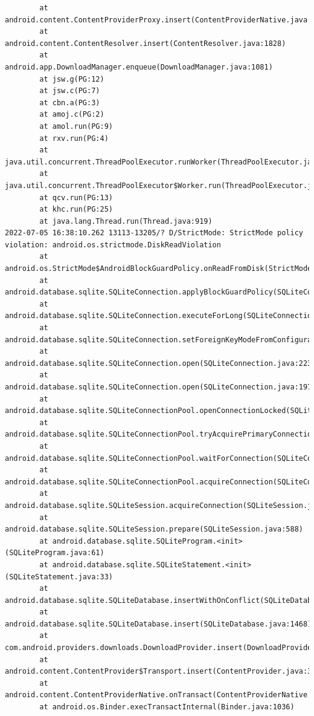 \documentclass[a4paper,12pt]{book}
\begin{document}
\begin{lstlisting}
        at android.content.ContentProviderProxy.insert(ContentProviderNative.java:481)
        at android.content.ContentResolver.insert(ContentResolver.java:1828)
        at android.app.DownloadManager.enqueue(DownloadManager.java:1081)
        at jsw.g(PG:12)
        at jsw.c(PG:7)
        at cbn.a(PG:3)
        at amoj.c(PG:2)
        at amol.run(PG:9)
        at rxv.run(PG:4)
        at java.util.concurrent.ThreadPoolExecutor.runWorker(ThreadPoolExecutor.java:1167)
        at java.util.concurrent.ThreadPoolExecutor$Worker.run(ThreadPoolExecutor.java:641)
        at qcv.run(PG:13)
        at khc.run(PG:25)
        at java.lang.Thread.run(Thread.java:919)
2022-07-05 16:38:10.262 13113-13205/? D/StrictMode: StrictMode policy violation: android.os.strictmode.DiskReadViolation
        at android.os.StrictMode$AndroidBlockGuardPolicy.onReadFromDisk(StrictMode.java:1571)
        at android.database.sqlite.SQLiteConnection.applyBlockGuardPolicy(SQLiteConnection.java:1138)
        at android.database.sqlite.SQLiteConnection.executeForLong(SQLiteConnection.java:688)
        at android.database.sqlite.SQLiteConnection.setForeignKeyModeFromConfiguration(SQLiteConnection.java:290)
        at android.database.sqlite.SQLiteConnection.open(SQLiteConnection.java:223)
        at android.database.sqlite.SQLiteConnection.open(SQLiteConnection.java:197)
        at android.database.sqlite.SQLiteConnectionPool.openConnectionLocked(SQLiteConnectionPool.java:505)
        at android.database.sqlite.SQLiteConnectionPool.tryAcquirePrimaryConnectionLocked(SQLiteConnectionPool.java:949)
        at android.database.sqlite.SQLiteConnectionPool.waitForConnection(SQLiteConnectionPool.java:699)
        at android.database.sqlite.SQLiteConnectionPool.acquireConnection(SQLiteConnectionPool.java:380)
        at android.database.sqlite.SQLiteSession.acquireConnection(SQLiteSession.java:896)
        at android.database.sqlite.SQLiteSession.prepare(SQLiteSession.java:588)
        at android.database.sqlite.SQLiteProgram.<init>(SQLiteProgram.java:61)
        at android.database.sqlite.SQLiteStatement.<init>(SQLiteStatement.java:33)
        at android.database.sqlite.SQLiteDatabase.insertWithOnConflict(SQLiteDatabase.java:1597)
        at android.database.sqlite.SQLiteDatabase.insert(SQLiteDatabase.java:1468)
        at com.android.providers.downloads.DownloadProvider.insert(DownloadProvider.java:972)
        at android.content.ContentProvider$Transport.insert(ContentProvider.java:309)
        at android.content.ContentProviderNative.onTransact(ContentProviderNative.java:154)
        at android.os.Binder.execTransactInternal(Binder.java:1036)

\end{lstlisting}
\end{document}
